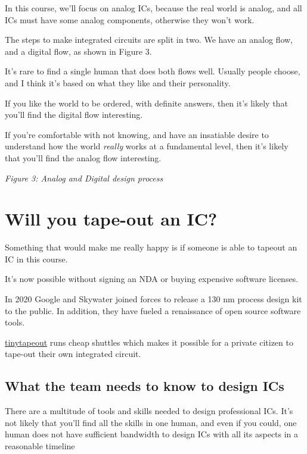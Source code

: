In this course, we'll focus on analog ICs, because the real world is
analog, and all ICs must have some analog components, otherwise they
won't work.

The steps to make integrated circuits are split in two. We have an
analog flow, and a digital flow, as shown in Figure 3.

It's rare to find a single human that does both flows well. Usually
people choose, and I think it's based on what they like and their
personality.

If you like the world to be ordered, with definite answers, then it's
likely that you'll find the digital flow interesting.

If you're comfortable with not knowing, and have an insatiable desire to
understand how the world \emph{really} works at a fundamental level,
then it's likely that you'll find the analog flow interesting.


{
\centering
{}
}

\emph{Figure 3: Analog and Digital design process }

\section{Will you tape-out an IC?}\label{will-you-tape-out-an-ic}

Something that would make me really happy is if someone is able to
tapeout an IC in this course.

It's now possible without signing an NDA or buying expensive software
licenses.

In 2020 Google and Skywater joined forces to release a 130 nm process
design kit to the public. In addition, they have fueled a renaissance of
open source software tools.

\href{https://tinytapeout.com}{tinytapeout} runs cheap shuttles which
makes it possible for a private citizen to tape-out their own integrated
circuit.

\subsection{What the team needs to know to design
ICs}\label{what-the-team-needs-to-know-to-design-ics}

There are a multitude of tools and skills needed to design professional
ICs. It's not likely that you'll find all the skills in one human, and
even if you could, one human does not have sufficient bandwidth to
design ICs with all its aspects in a reasonable timeline

